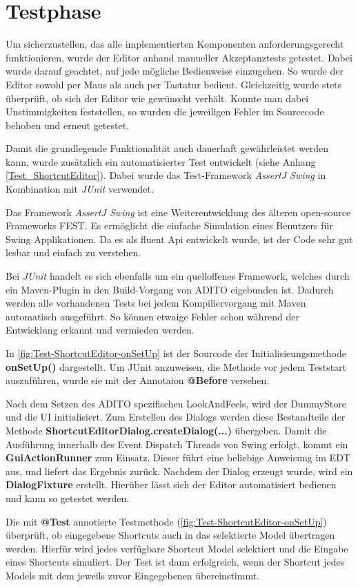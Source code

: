 \section{Testphase}

Um sicherzustellen, das alle implementierten Komponenten anforderungsgerecht funktionieren, wurde der Editor anhand manueller Akzeptanztests getestet. Dabei wurde darauf geachtet, auf jede mögliche Bedienweise einzugehen. So wurde der Editor sowohl per Maus als auch per Tastatur bedient. Gleichzeitig wurde stets überprüft, ob sich der Editor wie gewünscht verhält. Konnte man dabei Unstimmigkeiten feststellen, so wurden die jeweiligen Fehler im Sourcecode behoben und erneut getestet.

Damit die grundlegende Funktionalität auch dauerhaft gewährleistet werden kann, wurde zusätzlich ein automatisierter Test entwickelt (siehe Anhang \ref{Test_ShortcutEditor}). Dabei wurde das Test-Framework \emph{AssertJ Swing} in Kombination mit \emph{JUnit} verwendet.

Das Framework \emph{AssertJ Swing} ist eine Weiterentwicklung des älteren open-source Frameworks FEST. Es ermöglicht die einfache Simulation eines Benutzers für Swing Applikationen. Da es als fluent Api entwickelt wurde, ist der Code sehr gut lesbar und einfach zu verstehen.

Bei \emph{JUnit} handelt es sich ebenfalls um ein quelloffenes Framework, welches durch ein Maven-Plugin in den Build-Vorgang von ADITO eigebunden ist. Dadurch werden alle vorhandenen Tests bei jedem Kompiliervorgang mit Maven automatisch ausgeführt. So können etwaige Fehler schon während der Entwicklung erkannt und vermieden werden.



In \autoref{fig:Test-ShortcutEditor-onSetUp} ist der Sourcode der Initialisieungsmethode \textbf{onSetUp()} dargestellt. Um JUnit anzuweisen, die Methode vor jedem Teststart auszuführen, wurde sie mit der Annotaion \textbf{@Before} versehen. 

\vspace{10px}

Nach dem Setzen des ADITO spezifischen LookAndFeels, wird der DummyStore und die UI initialisiert. Zum Erstellen des Dialogs werden diese Bestandteile der Methode \textbf{ShortcutEditorDialog.createDialog(...)} übergeben. Damit die Ausführung innerhalb des Event Dispatch Threads von Swing erfolgt, kommt ein \textbf{GuiActionRunner} zum Einsatz. Dieser führt eine beliebige Anweisung im EDT aus, und liefert das Ergebnis zurück. Nachdem der Dialog erzeugt wurde, wird ein \textbf{DialogFixture} erstellt. Hierüber lässt sich der Editor automatisiert bedienen und kann so getestet werden.



Die mit \textbf{@Test} annotierte Testmethode (\autoref{fig:Test-ShortcutEditor-onSetUp}) überprüft, ob eingegebene Shortcuts auch in das selektierte Model übertragen werden. Hierfür wird jedes verfügbare Shortcut Model selektiert und die Eingabe eines Shortcuts simuliert. Der Test ist dann erfolgreich, wenn der Shortcut jedes Models mit dem jeweils zuvor Eingegebenen übereinstimmt.
\newpage